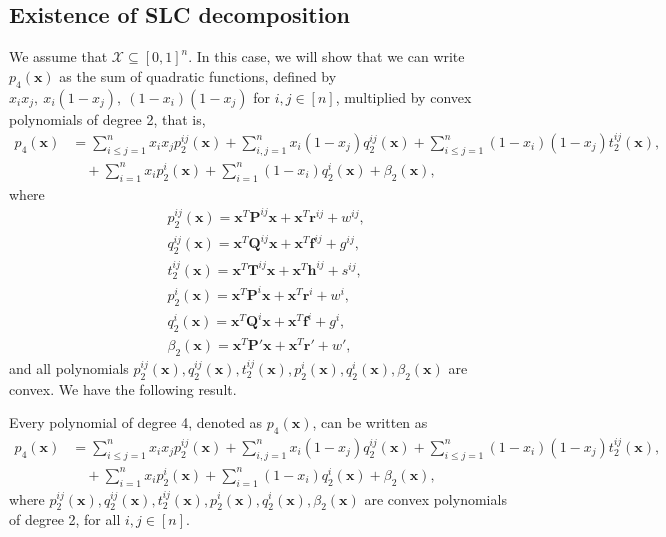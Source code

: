 \documentclass[opre,nonblindrev]{informs3} %
\begin{document}
\subsection{Existence of SLC decomposition}
We assume that $\mathcal{X} \subseteq [0,1]^n$. In this case, we will show that we can write $p_4(\boldsymbol{x})$ as the sum of quadratic functions, defined by $x_i x_j, \: x_i(1-x_j), \: (1-x_i)(1-x_j)$ for $i,j \in [n]$, multiplied by convex polynomials of degree 2, that is,
\begin{align}
    p_4(\boldsymbol{x}) &= \sum_{i \le j=1}^n x_i x_j p_2^{ij}(\boldsymbol{x}) + \sum_{i,j=1}^n x_i(1-x_j)q_2^{ij}(\boldsymbol{x}) + \sum_{i \le j=1}^n (1-x_i)(1-x_j) t_2^{ij}(\boldsymbol{x}), \\
    &\quad + \sum_{i=1}^n x_i p_2^i(\boldsymbol{x}) + \sum_{i=1}^n (1-x_i) q_2^i(\boldsymbol{x}) + \beta_2(\boldsymbol{x}), 
    \label{eq:poly4_decomp_gen}
\end{align} 
where  
\begin{align*}
    & p_2^{ij}(\boldsymbol{x}) = \boldsymbol{x}^T \boldsymbol{P}^{ij} \boldsymbol{x} + \boldsymbol{x}^T \boldsymbol{r}^{ij} + w^{ij}, \\ 
    & q_2^{ij}(\boldsymbol{x}) = \boldsymbol{x}^T \boldsymbol{Q}^{ij} \boldsymbol{x} + \boldsymbol{x}^T \boldsymbol{f}^{ij} + g^{ij}, \\ 
    & t_2^{ij}(\boldsymbol{x}) = \boldsymbol{x}^T \boldsymbol{T}^{ij} \boldsymbol{x} + \boldsymbol{x}^T \boldsymbol{h}^{ij} + s^{ij}, \\ 
    & p_2^i(\boldsymbol{x}) = \boldsymbol{x}^T \boldsymbol{P}^i \boldsymbol{x} + \boldsymbol{x}^T \boldsymbol{r}^i + w^i, \\ 
    & q_2^i(\boldsymbol{x}) = \boldsymbol{x}^T \boldsymbol{Q}^i \boldsymbol{x} + \boldsymbol{x}^T \boldsymbol{f}^i + g^i, \\ 
    & \beta_2(\boldsymbol{x}) = \boldsymbol{x}^T \boldsymbol{P}' \boldsymbol{x} + \boldsymbol{x}^T \boldsymbol{r}' + w',
\end{align*} 
and all polynomials $p_2^{ij}(\boldsymbol{x}), q_2^{ij}(\boldsymbol{x}), t_2^{ij}(\boldsymbol{x}),p_2^i(\boldsymbol{x}),q_2^i(\boldsymbol{x}),\beta_2(\boldsymbol{x})$ are convex. We have the following result.
\begin{theorem}
\label{thm:exist_degree4}
Every polynomial of degree 4, denoted as $p_4(\boldsymbol{x})$, can be written as 
\begin{align*}
    p_4(\boldsymbol{x}) &= \sum_{i \le j=1}^n x_i x_j p_2^{ij}(\boldsymbol{x}) + \sum_{i,j=1}^n x_i(1-x_j)q_2^{ij}(\boldsymbol{x}) + \sum_{i \le j=1}^n (1-x_i)(1-x_j) t_2^{ij}(\boldsymbol{x}), \\ 
    &\quad + \sum_{i=1}^n x_i p_2^i(\boldsymbol{x}) + \sum_{i=1}^n (1-x_i) q_2^i(\boldsymbol{x}) + \beta_2(\boldsymbol{x}),
\end{align*}  
where $p_2^{ij}(\boldsymbol{x}),q_2^{ij}(\boldsymbol{x}), t_2^{ij}(\boldsymbol{x}),p_2^{i}(\boldsymbol{x}),q_2^{i}(\boldsymbol{x}), \beta_2(\boldsymbol{x})$ are convex polynomials of degree 2, for all $i,j \in [n]$. 
\end{theorem}  
\end{document}
